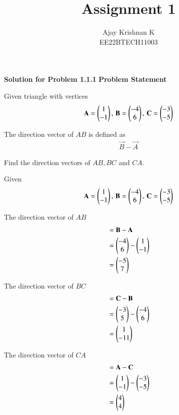 \documentclass[journal,11pt]{IEEEtran}
\begin{document}
\vspace{3cm}
\author{Ajay Krishnan K\\EE22BTECH11003}

\title{Assignment 1}
\maketitle

\textbf{Solution for Problem 1.1.1}
\bigbreak
\textbf{Problem Statement}

Given triangle with vertices
\begin{align}
    \label{eq:tri-pts}
    \mathbf{A} = \begin{pmatrix} 1 \\ -1 \end{pmatrix},\,
    \mathbf{B} = \begin{pmatrix}-4 \\ 6\end{pmatrix},\,
    \mathbf{C} = \begin{pmatrix}-3 \\ -5\end{pmatrix}
\end{align}

The direction vector of $AB$ is defined as
\begin{align}
    \vec{B}-
    \vec{A}
\end{align}

Find the direction vectors of $AB, BC$ and $CA$.
\bigbreak

\fi
\solution

Given
\begin{align}
    \mathbf{A} = \begin{pmatrix}1  \\ -1\end{pmatrix},\,
    \mathbf{B} = \begin{pmatrix}-4 \\ 6\end{pmatrix},\,
    \mathbf{C} = \begin{pmatrix}-3 \\ -5\end{pmatrix}
\end{align}

The direction vector of $AB$
\begin{align}
     & = \mathbf{B} - \mathbf{A} \\
     & = \begin{pmatrix}-4 \\ 6\end{pmatrix} - \begin{pmatrix}1 \\ -1\end{pmatrix} \\
     & = \begin{pmatrix}-5 \\ 7\end{pmatrix}
\end{align}

The direction vector of $BC$
\begin{align}
     & = \mathbf{C} - \mathbf{B} \\
     & = \begin{pmatrix}-3 \\ 5\end{pmatrix} - \begin{pmatrix}-4 \\ 6\end{pmatrix} \\
     & = \begin{pmatrix}1  \\ -11\end{pmatrix}
\end{align}

The direction vector of $CA$
\begin{align}
     & = \mathbf{A} - \mathbf{C} \\
     & = \begin{pmatrix}1 \\ -1\end{pmatrix} - \begin{pmatrix}-3 \\ -5\end{pmatrix} \\
     & = \begin{pmatrix} 4 \\ 4 \end{pmatrix}
\end{align}
\end{document}
